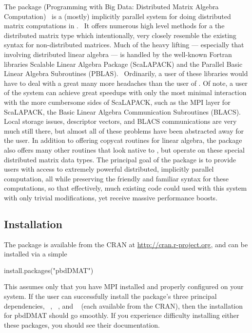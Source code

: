 The  package (Programming with Big Data: Distributed Matrix Algebra Computation)~\citep{Schmidt2012pbdDMATpackage} is a (mostly) implicitly parallel system for doing distributed matrix computations in .~\citep{Rcore}  It offers numerous high level methods for a the ~\citep{Schmidt2012pbdBASEpackage} distributed matrix type  which intentionally, very closely resemble the existing  syntax for non-distributed matrices.  Much of the heavy lifting --- especially that involving distributed linear algebra --- is handled by the well-known Fortran libraries Scalable Linear Algebra Package (ScaLAPACK) and the Parallel Basic Linear Algebra Subroutines (PBLAS).~\citep{slug}
\np
Ordinarily, a user of these libraries would have to deal with a great many more headaches than the user of .  Of note, a user of the  system can achieve great speedups with only the most minimal interaction with the more cumbersome sides of ScaLAPACK, such as the MPI layer for ScaLAPACK, the Basic Linear Algebra Communication Subroutines (BLACS).~\citep{blug}  Local storage issues, descriptor vectors, and BLACS communications are very much still there, but almost all of these problems have been abstracted away for the user.  In addition to offering copycat routines for linear algebra, the  package also offers many other routines that look native to , but operate on these special distributed matrix data types.
\np
The principal goal of the  package is to provide  users with access to extremely powerful distributed, implicitly parallel computation, all while preserving the friendly and familiar  syntax for these computations, so that effectively, much existing  code could used with this system with only trivial modifications, yet receive massive performance boosts.

\subsection[]{Installation}
\label{sec:installation}

The  package is available from the CRAN at
\url{http://cran.r-project.org}, and can be installed via a simple 
\begin{Code}
install.packages("pbdDMAT")
\end{Code}
This assumes only that you have MPI installed and properly configured on your system.  If the user can successfully install the package's three principal dependencies, ~\citep{Chen2012pbdMPIpackage}, ~\citep{Chen2012pbdSLAPpackage}, and ~\citep{Schmidt2012pbdBASEpackage} (each available from the CRAN), then the installation for pbdDMAT should go smoothly.  If you experience difficulty installing either these packages, you should see their documentation.


